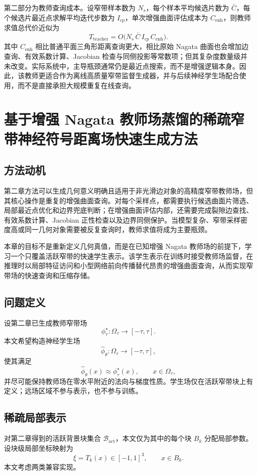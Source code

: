 \documentclass[12pt,oneside]{ctexbook}
\begin{document}
第二部分为教师查询成本。设窄带样本数为 $N_s$，每个样本平均候选片数为 $\bar C$，每个候选片最近点求解平均迭代步数为 $I_{cp}$，单次增强曲面评估成本为 $C_{\mathrm{enh}}$，则教师求值总代价近似为
\[
T_{\mathrm{teacher}}=O\big(N_s\,\bar C\,I_{cp}\,C_{\mathrm{enh}}\big).
\]
其中 $C_{\mathrm{enh}}$ 相比普通平面三角形距离查询更大，相比原始 Nagata 曲面也会增加边查询、有效系数计算、Jacobian 检查与同侧投影等常数项；但其复杂度数量级并未改变。实际系统中，主导瓶颈通常仍是最近点搜索，而不是增强逻辑本身。因此，该教师更适合作为离线高质量窄带监督生成器，并与后续神经学生场配合使用，而不是直接承担大规模重复在线查询。

\chapter{基于增强 Nagata 教师场蒸馏的稀疏窄带神经符号距离场快速生成方法}
\section{方法动机}
第二章方法可以生成几何意义明确且适用于非光滑边对象的高精度窄带教师场，但其核心操作是重复的增强曲面查询。对每个采样点，都需要执行候选曲面片筛选、局部最近点优化和边界兜底判断；在增强曲面评估内部，还需要完成裂隙边查找、有效系数计算、Jacobian 正性检查以及边界同侧保护。当模型复杂、窄带采样密度高或同一几何对象需要被反复查询时，教师求值将成为主要瓶颈。

本章的目标不是重新定义几何真值，而是在已知增强 Nagata 教师场的前提下，学习一个只覆盖活跃窄带的快速学生表示。该学生表示在训练时接受教师场监督，在推理时以局部特征访问和小型网络前向传播替代昂贵的增强曲面查询，从而实现窄带场的快速查询和压缩存储。

\section{问题定义}
设第二章已生成教师窄带场
\[
\phi^\star_\tau:\Omega_\tau\to[-\tau,\tau].
\]
本文希望构造神经学生场
\[
\hat\phi_\theta:\Omega_\tau\to[-\tau,\tau],
\]
使其满足
\[
\hat\phi_\theta(x)\approx \phi^\star_\tau(x),\qquad x\in\Omega_\tau,
\]
并尽可能保持教师场在零水平附近的法向与梯度性质。学生场仅在活跃窄带块上有定义；远场区域不参与表示，也不参与训练。

\section{稀疏局部表示}
对第二章得到的活跃背景块集合 $\mathcal B_{\mathrm{act}}$，本文仅为其中的每个块 $B_k$ 分配局部参数。设块级局部坐标映射为
\[
\xi=T_k(x)\in[-1,1]^3,
\qquad x\in B_k.
\]
本文考虑两类兼容实现。
\end{document}
